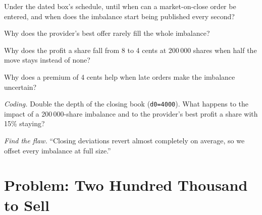 \begin{exercise}[$\star$]\label{exo:hf:auctions-and-the-close:3}
Under the dated box's schedule, until when can a market-on-close order be entered, and when does the imbalance start being published every second?
\end{exercise}

\begin{exercise}[$\star\star$]\label{exo:hf:auctions-and-the-close:4}
Why does the provider's best offer rarely fill the whole imbalance?
\end{exercise}

\begin{exercise}[$\star\star$]\label{exo:hf:auctions-and-the-close:5}
Why does the profit a share fall from 8 to 4 cents at 200\,000 shares when half the move stays instead of none?
\end{exercise}

\begin{exercise}[$\star\star$]\label{exo:hf:auctions-and-the-close:6}
Why does a premium of 4 cents help when late orders make the imbalance uncertain?
\end{exercise}

\begin{exercise}[$\star\star\star$]\label{exo:hf:auctions-and-the-close:7}
\emph{Coding.} Double the depth of the closing book (\texttt{d0=4000}). What happens to the impact of a 200\,000-share imbalance and to the
provider's best profit a share with 15\% staying?
\end{exercise}

\begin{exercise}[$\star\star\star$]\label{exo:hf:auctions-and-the-close:8}
\emph{Find the flaw.} ``Closing deviations revert almost completely on average, so we offset every imbalance at full size.''
\end{exercise}

\section{Problem: Two Hundred Thousand to Sell}

